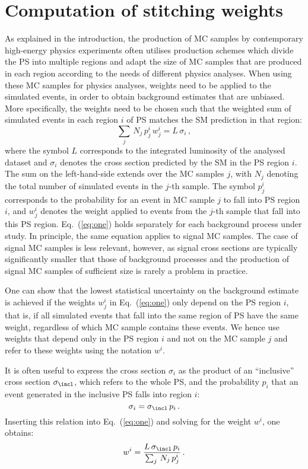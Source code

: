 \section{Computation of stitching weights}
\label{sec:stitching_weights}

As explained in the introduction,
the production of MC samples by contemporary high-energy physics experiments often utilises production schemes
which divide the PS into multiple regions and adapt the size of MC samples that are produced in each region 
according to the needs of different physics analyses.
When using these MC samples for physics analyses,
weights need to be applied to the simulated events, in order to obtain background estimates that are unbiased.
More specifically, the weights need to be chosen such that the weighted sum of simulated events in each region $i$ of PS 
matches the SM prediction in that region:
\begin{equation}
\sum_{j} \, N_{j} \, p_{j}^{i} \, w_{j}^{i} = L \, \sigma_{i} \, ,
\label{eq:one}
\end{equation}
where the symbol $L$ corresponds to the integrated luminosity of the analysed dataset
and $\sigma_{i}$ denotes the cross section predicted by the SM in the PS region $i$.
The sum on the left-hand-side extends over the MC samples $j$,
with $N_{j}$ denoting the total number of simulated events in the $j$-th sample.
The symbol $p_{j}^{i}$ corresponds to the probability for an event in MC sample $j$ to fall into PS region $i$,
and $w_{j}^{i}$ denotes the weight applied to events from the $j$-th sample that fall into this PS region.
Eq.~(\ref{eq:one}) holds separately for each background process under study.
In principle, the same equation applies to signal MC samples. 
The case of signal MC samples is less relevant, however,
as signal cross sections are typically significantly smaller that those of background processes 
and the production of signal MC samples of sufficient size is rarely a problem in practice.

One can show that the lowest statistical uncertainty on the background estimate is achieved 
if the weights $w_{j}^{i}$ in Eq.~(\ref{eq:one}) only depend on the PS region $i$,
that is, if all simulated events that fall into the same region of PS have the same weight,
regardless of which MC sample contains these events.
We hence use weights that depend only in the PS region $i$ and not on the MC sample $j$ 
and refer to these weights using the notation $w^{i}$.

It is often useful to express the cross section $\sigma_{i}$ as the product of an ``inclusive'' cross section $\sigma_{\incl}$,
which refers to the whole PS, and the probability $p_{i}$ that an event generated in the inclusive PS falls into region $i$:
\begin{equation*}
\sigma_{i} = \sigma_{\incl} \, p_{i} \, .
\label{eq:two}
\end{equation*}
Inserting this relation into Eq.~(\ref{eq:one}) and solving for the weight $w^{i}$, one obtains:
\begin{equation}
w^{i} = \frac{L \, \sigma_{\incl} \, p_{i}}{\sum_{j} \, N_{j} \, p_{j}^{i}} \, .
\label{eq:master}
\end{equation}

